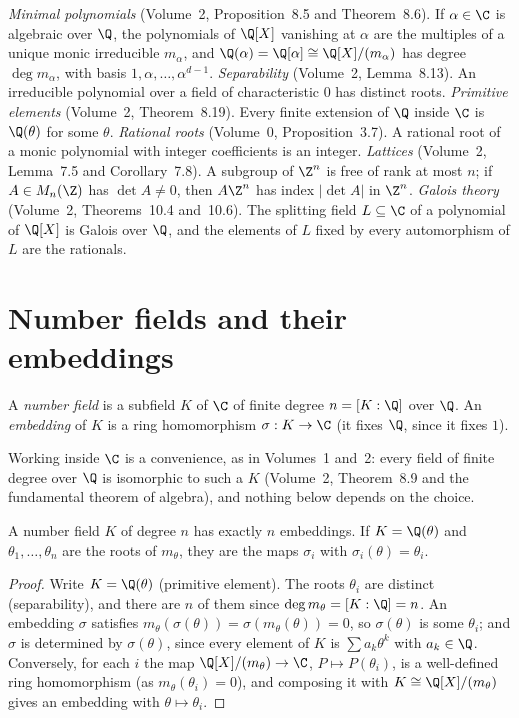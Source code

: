 \begin{reminder}
\emph{Minimal polynomials} (Volume~2, Proposition~8.5 and Theorem~8.6). If $\alpha\in\C$ is algebraic over $\Q$, the
polynomials of $\Q[X]$ vanishing at $\alpha$ are the multiples of a unique monic irreducible $m_\alpha$, and
$\Q(\alpha)=\Q[\alpha]\cong\Q[X]/(m_\alpha)$ has degree $\deg m_\alpha$, with basis $1,\alpha,\dots,\alpha^{d-1}$.
\emph{Separability} (Volume~2, Lemma~8.13). An irreducible polynomial over a field of characteristic $0$ has distinct
roots. \emph{Primitive elements} (Volume~2, Theorem~8.19). Every finite extension of $\Q$ inside $\C$ is $\Q(\theta)$
for some $\theta$. \emph{Rational roots} (Volume~0, Proposition~3.7). A rational root of a monic polynomial with
integer coefficients is an integer. \emph{Lattices} (Volume~2, Lemma~7.5 and Corollary~7.8). A subgroup of $\Z^n$ is free
of rank at most $n$; if $A\in M_n(\Z)$ has $\det A\ne0$, then $A\Z^n$ has index $|\det A|$ in $\Z^n$. \emph{Galois
theory} (Volume~2, Theorems~10.4 and~10.6). The splitting field $L\subseteq\C$ of a polynomial of $\Q[X]$ is Galois over
$\Q$, and the elements of $L$ fixed by every automorphism of $L$ are the rationals.
\end{reminder}

\section{Number fields and their embeddings}

\begin{definition}
A \emph{number field} is a subfield $K$ of $\C$ of finite degree $n=[K:\Q]$ over $\Q$. An \emph{embedding} of $K$ is
a ring homomorphism $\sigma:K\to\C$ (it fixes $\Q$, since it fixes $1$).
\end{definition}

Working inside $\C$ is a convenience, as in Volumes~1 and~2: every field of finite degree over $\Q$ is isomorphic to
such a $K$ (Volume~2, Theorem~8.9 and the fundamental theorem of algebra), and nothing below depends on the choice.

\begin{proposition}\label{prop:embeddings}
A number field $K$ of degree $n$ has exactly $n$ embeddings. If $K=\Q(\theta)$ and $\theta_1,\dots,\theta_n$ are the
roots of $m_\theta$, they are the maps $\sigma_i$ with $\sigma_i(\theta)=\theta_i$.
\end{proposition}
\begin{proof}
Write $K=\Q(\theta)$ (primitive element). The roots $\theta_i$ are distinct (separability), and there are $n$ of them
since $\deg m_\theta=[K:\Q]=n$. An embedding $\sigma$ satisfies $m_\theta(\sigma(\theta))=\sigma(m_\theta(\theta))=0$,
so $\sigma(\theta)$ is some $\theta_i$; and $\sigma$ is determined by $\sigma(\theta)$, since every element of $K$ is
$\sum a_k\theta^k$ with $a_k\in\Q$. Conversely, for each $i$ the map
$\Q[X]/(m_\theta)\to\C$, $P\mapsto P(\theta_i)$, is a well-defined ring homomorphism (as $m_\theta(\theta_i)=0$), and
composing it with $K\cong\Q[X]/(m_\theta)$ gives an embedding with $\theta\mapsto\theta_i$.
\end{proof}

